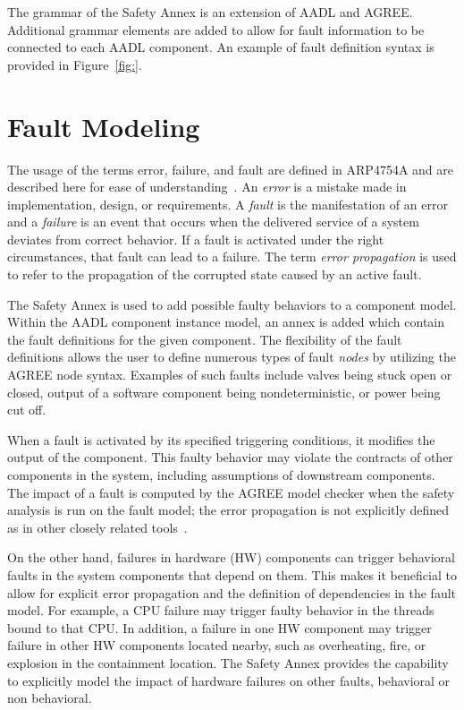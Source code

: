 The grammar of the Safety Annex is an extension of AADL and AGREE. Additional grammar elements are added to allow for fault information to be connected to each AADL component. An example of fault definition syntax is provided in Figure~\ref{fig:}. 

\section{Fault Modeling}
The usage of the terms error, failure, and fault are defined in ARP4754A and are described here for ease of understanding~\cite{SAE:ARP4754A}. An \textit{error} is a mistake made in implementation, design, or requirements. A \textit{fault} is the manifestation of an error and a \textit{failure} is an event that occurs when the delivered service of a system deviates from correct behavior. If a fault is activated under the right circumstances, that fault can lead to a failure. The term \textit{error propagation} is used to refer to the propagation of the corrupted state caused by an active fault. 

The Safety Annex is used to add possible faulty behaviors to a component model. Within the AADL component instance model, an annex is added which contain the fault definitions for the given component. The flexibility of the fault definitions allows the user to define numerous types of fault \textit{nodes} by utilizing the AGREE node syntax. Examples of such faults include valves being stuck open or closed, output of a software component being nondeterministic, or power being cut off.  

When a fault is activated by its specified triggering conditions, it modifies the output of the component. This faulty behavior may violate the contracts of other components in the system, including assumptions of downstream components. The impact of a fault is computed by the AGREE model checker when the safety analysis is run on the fault model; the error propagation is not explicitly defined as in other closely related tools~\cite{EMV2,compass30toolset}. 

On the other hand, failures in hardware (HW) components can trigger behavioral faults in the system components that depend on them. This makes it beneficial to allow for explicit error propagation and the definition of dependencies in the fault model. For example, a CPU failure may trigger faulty behavior in the threads bound to that CPU. In addition, a failure in one HW component may trigger failure in other HW components located nearby, such as overheating, fire, or explosion
in the containment location. The Safety Annex provides the capability to explicitly model the impact of hardware failures on other faults, behavioral or non behavioral. 

